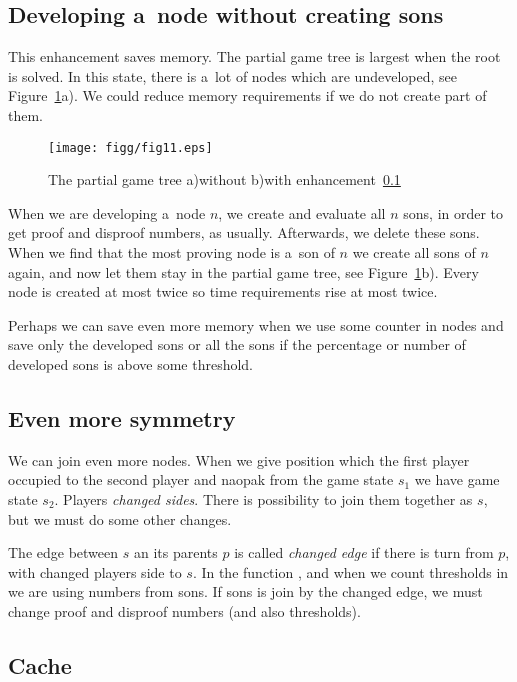 \subsection{Developing a~node without creating sons} \label{lastenh}

This enhancement saves memory. The partial game tree is largest when the root is
solved. In this state, there is a~lot of nodes which are undeveloped, see 
Figure~\ref{jedenact}a). We could reduce memory requirements if we do not
create part of them. 

\begin{figure}
	\centerline{\mbox{\texttt{[image: figg/fig11.eps]}}}
	\caption{The partial game tree a)without b)with enhancement~\ref{lastenh}}
	\label{jedenact}
\end{figure}

When we are developing a~node $n$, we create and evaluate all $n$ sons, in order
to get proof and disproof numbers, as usually. Afterwards, we delete these
sons. When we find that the  most proving node is a~son of $n$ we create all
sons of $n$ again, and now let them stay in the partial game tree, see
Figure~\ref{jedenact}b). Every node is created at most twice so time
requirements rise at most twice.  

Perhaps we can save even more memory when we use some counter in nodes
and save only the developed sons or all the sons if the percentage or number 
of developed sons is above some threshold.

\subsection{Even more symmetry} \label{lastenh2}

We can join even more nodes. When we give position which the first player
occupied to the second player and naopak from the game state $s_1$ we have game
state $s_2$. Players \emph{changed sides}. There is possibility to join them
together as $s$, but we must do some other changes. 

The edge between $s$ an its parents $p$ is called \emph{changed edge} if there
is turn from $p$, with changed players side to $s$.  In the function
,  and when we count
thresholds in  we are using numbers from sons.  If sons is
join by the changed edge, we must change proof and disproof numbers (and also
thresholds).

\subsection{Cache}

